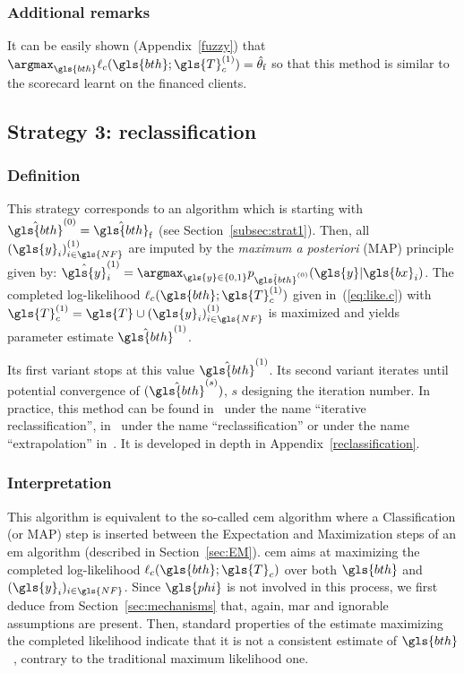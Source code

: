 \subsubsection{Additional remarks}
It can be easily shown (Appendix~\ref{fuzzy}) that $\argmax_{\gls{bth}} \ell_c(\gls{bth};\gls{T}_c^{(1)}) = \hat{\theta}_{\text{f}}$ so that this method is similar to the scorecard learnt on the financed clients.

\subsection{Strategy 3: reclassification}

\subsubsection{Definition}
This strategy corresponds to an algorithm which is starting with $\hat{\gls{bth}}^{(0)} = \hat{\gls{bth}}_\text{f}$ (see Section~\ref{subsec:strat1}). Then, all $(\gls{y}_i)^{(1)}_{i \in \gls{NF}}$ are imputed by the {\it maximum a posteriori} (MAP) principle given by: $\hat{\gls{y}}^{(1)}_i = \argmax_{\gls{y} \in \{0,1\}} p_{\hat{\gls{bth}}^{(0)}}(\gls{y} | \gls{bx}_i)$. The completed log-likelihood $\ell_c(\gls{bth};\gls{T}_c^{(1)})$ given in~(\ref{eq:like.c}) with $\gls{T}_c^{(1)}=\gls{T} \cup (\gls{y}_i)^{(1)}_{i \in \gls{NF}}$ is maximized and yields parameter estimate $\hat{\gls{bth}}^{(1)}$.

Its first variant stops at this value $\hat{\gls{bth}}^{(1)}$. Its second variant iterates until potential convergence of $(\hat{\gls{bth}}^{(s)})$, $s$ designing the iteration number. In practice, this method can be found in~\cite{saporta} under the name ``iterative reclassification'', in~\cite{RI6} under the name ``reclassification'' or under the name ``extrapolation'' in~\cite{banasik}. It is developed in depth in Appendix~\ref{reclassification}.

\subsubsection{Interpretation}
This algorithm is equivalent to the so-called \gls{cem} algorithm where a Classification (or MAP) step is inserted between the Expectation and Maximization steps of an \gls{em} algorithm (described in Section~\ref{sec:EM}).
\gls{cem} aims at maximizing the completed log-likelihood $\ell_c(\gls{bth};\gls{T}_c)$ over both $\gls{bth}$ and $(\gls{y}_i)_{i \in \gls{NF}}$. Since $\gls{phi}$ is not involved in this process, we first deduce from Section~\ref{sec:mechanisms} that, again, \gls{mar} and ignorable assumptions are present. Then, standard properties of the estimate maximizing the completed likelihood indicate that it is not a consistent estimate of $\gls{bth}$~\cite{celeux1992classification}, contrary to the traditional maximum likelihood one.

